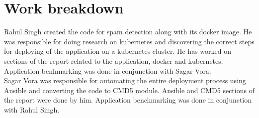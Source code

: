 \documentclass[9pt,twocolumn,twoside]{../../styles/osajnl}
\begin{document}
\section{Work breakdown}
Rahul Singh created the code for spam detection along with its docker
image. He was responsible for doing research on kubernetes and
discovering the correct steps for deploying of the application on a
kubernetes cluster. He has worked on sections of the report related to
the application, docker and kubernetes. Application benhmarking was
done in conjunction with Sagar Vora.\\

Sagar Vora was responsible for automating the entire deployment
process using Ansible and converting the code to CMD5 module. Ansible
and CMD5 sections of the report were done by him. Application
benchmarking was done in conjunction with Rahul Singh.
\end{document}
